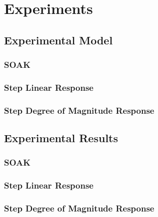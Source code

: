 \chapter{Experiments}

\section{Experimental Model} 
\subsection{SOAK}
\subsection{Step Linear Response}
\subsection{Step Degree of Magnitude Response}

\section{Experimental Results}

\subsection{SOAK}
\subsection{Step Linear Response}
\subsection{Step Degree of Magnitude Response}